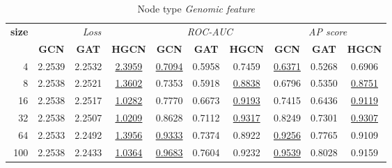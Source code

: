 \begin{table}
    \begin{subtable}[t]{\textwidth}
        \centering
        \begin{tabular}{r|ccc|ccc|ccc}      
            \toprule
            \multirow{2}{*}{\textbf{size}} & \multicolumn{3}{c|}{\textit{Loss}} & \multicolumn{3}{c|}{\textit{ROC-AUC}} & \multicolumn{3}{c}{\textit{AP score}} \\
            & \textbf{GCN} & \textbf{GAT} & \textbf{HGCN} & \textbf{GCN} & \textbf{GAT} & \textbf{HGCN} & \textbf{GCN} & \textbf{GAT} & \textbf{HGCN} \\
            \midrule
            4 & 2.2539 & 2.2532 & \underline{2.3959} & \underline{0.7094} & 0.5958 & 0.7459 & \underline{0.6371} & 0.5268 & 0.6906 \\
            8 & 2.2538 & 2.2521 & \underline{1.3602} & 0.7353 & 0.5918 & \underline{0.8838} & 0.6796 & 0.5350 & \underline{0.8751} \\
            16 & 2.2538 & 2.2517 & \underline{1.0282} & 0.7770 & 0.6673 & \underline{0.9193} & 0.7415 & 0.6436 & \underline{0.9119} \\
            32 & 2.2538 & 2.2507 & \underline{1.0209} & 0.8628 & 0.7112 & \underline{0.9317} & 0.8249 & 0.7301 & \underline{0.9307} \\
            64 & 2.2533 & 2.2492 & \underline{1.3956} & \underline{0.9333} & 0.7374 & 0.8922 & \underline{0.9256} & 0.7765 & 0.9109 \\
            100 & 2.2538 & 2.2433 & \underline{1.0364} & \underline{0.9683} & 0.7604 & 0.9232 & \underline{0.9539} & 0.8028 & 0.9159 \\
            \bottomrule
        \end{tabular}
        \caption{Node type \textit{Genomic feature}}
    \end{subtable}
    
    \vspace{1em}
    

\end{table}
